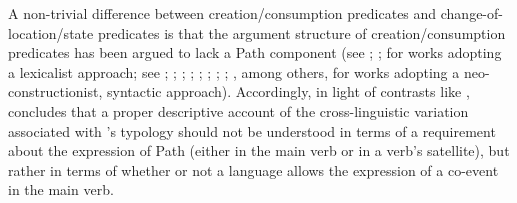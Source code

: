 \documentclass[output=paper,colorlinks,citecolor=brown]{langscibook}
\begin{document}
\noindent A non-trivial difference between creation/consumption predicates and change-of-location/state predicates is that the argument structure of creation/con\-sump\-tion predicates has been argued to lack a Path component (see \citealt{RappaportHovavAndLevin1998}; \citealt{RappaportHovav2008}; \citealt{RappaportHovavAndLevin2010} for works adopting a lexicalist approach; see \citealt{HaleAndKeyser1993}; \citeyear{HaleAndKeyser2002}; \citealt{Mateu2002}; \citealt{Harley2005}; \citealt{FolliAndHarley2005}; \citeyear{FolliAndHarley2008}; \citeyear{FolliAndHarley2020}; \citealt{big:Ramchand2008}; \citealt{Acedo-Matellan2016}, among others, for works adopting a neo-constructionist, syntactic approach). %
Accordingly, in light of contrasts like , \citet{Mateu2012} concludes that a proper descriptive account of the cross-linguistic variation associated with \citeauthor{Talmy2000}'s typology should not be understood in terms of a requirement about the expression of Path (either in the main verb or in a verb's satellite), but rather in terms of whether or not a language allows the expression of a co-event in the main verb.
\end{document}
